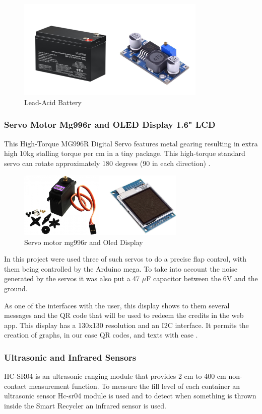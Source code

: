 \documentclass[a4paper,11pt]{article}
\begin{document}
\begin{figure}[H]
  \centering
  \includegraphics[width=9cm]{Figures/Battery-Regulator.png}
  \caption{\small{Lead-Acid Battery}}
  \label{fig:Battery}
\end{figure}

\subsubsection{Servo Motor Mg996r and OLED Display 1.6" \space LCD}
\label{subsubsec:servomotor}
This High-Torque MG996R Digital Servo features metal gearing resulting in extra high 10kg stalling torque per cm in a tiny package. This high-torque standard servo can rotate approximately 180 degrees (90 in each direction) \cite{servo}.

\begin{figure}[H]
  \centering
  \includegraphics[width=8cm]{Figures/Motor_Oled.png}
  \caption{\small{Servo motor mg996r and Oled Display}}
  \label{fig:servo}
\end{figure}

In this project were used three of such servos to do a precise flap control, with them being controlled by the Arduino mega. To take into account the noise generated by the servos it was also put a 47 $\mu$F capacitor between the 6V and the ground.

As one of the interfaces with the user, this display shows to them several messages and the QR code that will be used to redeem the credits in the web app. This display has a 130x130 resolution and an I2C interface. It permits the creation of graphs, in our case QR codes, and texts with ease \cite{oleddisplay}.

\subsubsection{Ultrasonic and Infrared Sensors}
\label{subsubsec:ultrasonic}
HC-SR04 is an ultrasonic ranging module that provides 2 cm to 400 cm non-contact measurement function\cite{ultrasonic}. To measure the fill level of each container an ultrasonic sensor Hc-sr04 module is used and to detect when something is thrown inside the Smart Recycler an infrared sensor is used.
\end{document}
